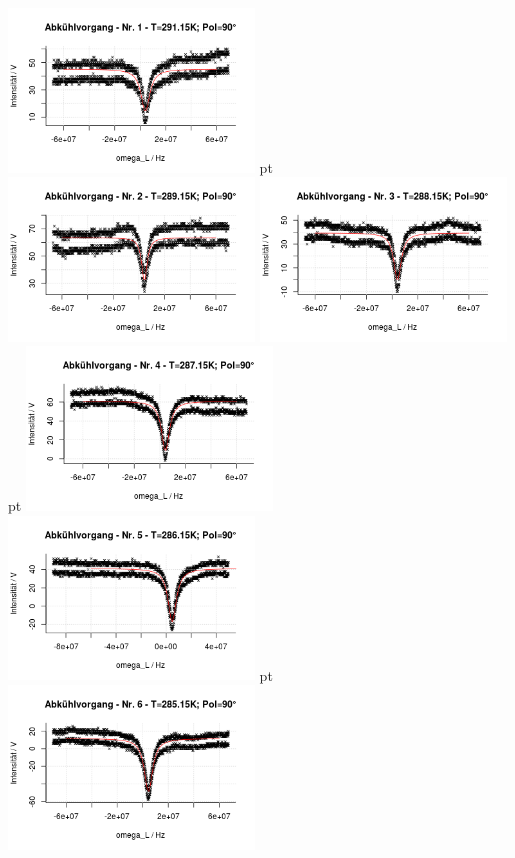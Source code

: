 \documentclass[12pt]{article}
\begin{document}
\begin{minipage}[h!]{\textwidth}
	\centering
	\includegraphics[width=0.49\textwidth]{figures/cold90-1.png} pt
	\includegraphics[width=0.49\textwidth]{figures/cold90-2.png}\vskip -10pt
	\includegraphics[width=0.49\textwidth]{figures/cold90-3.png} pt
	\includegraphics[width=0.49\textwidth]{figures/cold90-4.png}\vskip -10pt
	\includegraphics[width=0.49\textwidth]{figures/cold90-5.png} pt
	\includegraphics[width=0.49\textwidth]{figures/cold90-6.png}\vskip -10pt
\end{minipage}
\end{document}
